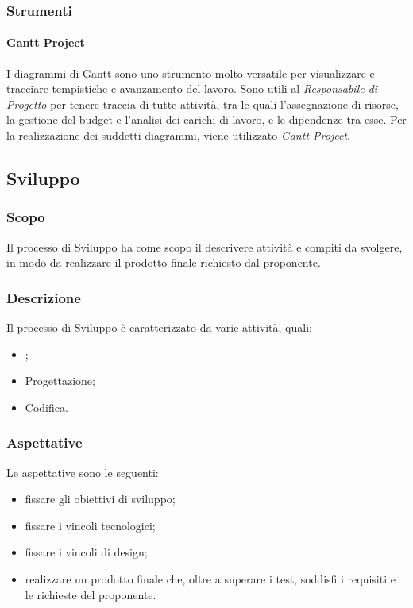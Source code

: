 \subsubsection{Strumenti}

\paragraph{Gantt Project}

I diagrammi di Gantt sono uno strumento molto versatile per visualizzare e tracciare tempistiche e avanzamento del lavoro.  Sono utili al \textit{Responsabile di Progetto} per tenere traccia di tutte attività, tra le quali l'assegnazione di risorse,  la gestione del budget e l'analisi dei carichi di lavoro, e le dipendenze tra esse.  Per la realizzazione dei suddetti diagrammi, viene utilizzato \textit{Gantt Project}.

\subsection{Sviluppo}

\subsubsection{Scopo}

Il processo di Sviluppo ha come scopo il descrivere attività e compiti da svolgere,  in modo da realizzare il prodotto finale richiesto dal proponente.

\subsubsection{Descrizione}

Il processo di Sviluppo è caratterizzato da varie attività,  quali:
\begin{itemize}

\item \AdR;

\item Progettazione;

\item Codifica.

\end{itemize}

\subsubsection{Aspettative}

Le aspettative sono le seguenti:
\begin{itemize}

\item fissare gli obiettivi di sviluppo;

\item fissare i vincoli tecnologici;

\item fissare i vincoli di design;

\item realizzare un prodotto finale che,  oltre a superare i test,  soddisfi i requisiti e le richieste del proponente.

\end{itemize}

